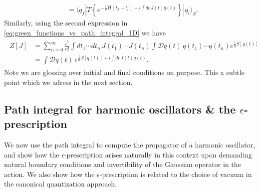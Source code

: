 \documentclass[../QFT_main.tex]{subfiles}
\begin{document}
\begin{mytheorem}
{\begin{align}
    \\
    &= \langle q_f | T\left\{ e^{-\tfrac{i}{\hbar} \hat{H}(t_f-t_i)+i\int dt\, J(t) \hat{q}(t)} \right\} | q_i \rangle_S.
\end{align}}
Similarly, using the second expression in \eqref{eq:green_functions_vs_path_integral_1D} we have
{\small\begin{align}\begin{aligned}
    Z[J] &= \sum_{n=0}^{\infty} \tfrac{i^n}{n!} \int dt_1 \cdots dt_n\, J(t_1)\cdots J(t_n) \int \mathcal{D}q(t)\, q(t_1)\cdots q(t_n) e^{\frac{i}{\hbar}S[q(t)]}
    \\
    &=\int \mathcal{D}q(t)\, e^{\frac{i}{\hbar}S[q(t)]+ i\int dt\, J(t) q(t)}.
\end{aligned}
\end{align}}
%
Note we are glossing over initial and final conditions on purpose.
This a subtle point which we adress in the next section.
\end{mytheorem}



\subsection{Path integral for harmonic oscillators \& the $\epsilon$-prescription}

We now use the path integral to compute the propagator of a harmonic oscillator, and show how the $\epsilon$-prescription arises naturally in this context upon demanding natural boundary conditions and invertibility of the Gaussian operator in the action. We also show how the $\epsilon$-prescription is related to the choice of vacuum in the canonical quantization approach.
\end{document}
